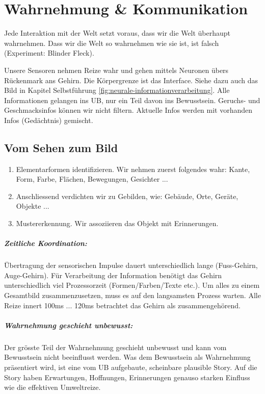 \chapter{Wahrnehmung \& Kommunikation}

Jede Interaktion mit der Welt setzt voraus, dass wir die Welt überhaupt wahrnehmen. Dass wir die Welt so wahrnehmen wie sie ist, ist falsch (Experiment: Blinder Fleck).

Unsere Sensoren nehmen Reize wahr und gehen mittels Neuronen übers Rückenmark ans Gehirn. Die Körpergrenze ist das Interface. Siehe dazu auch das Bild in Kapitel Selbstführung \ref{fig:neurale-informationverarbeitung}. Alle Informationen gelangen ins UB, nur ein Teil davon ins Bewusstsein. Geruchs- und Geschmacksinfos können wir nicht filtern. Aktuelle Infos werden mit vorhanden Infos (Gedächtnis) gemischt.

\section{Vom Sehen zum Bild}
\begin{enumerate}
	\item Elementarformen identifizieren. Wir nehmen zuerst folgendes wahr: Kante, Form, Farbe, Flächen, Bewegungen, Gesichter ...
	\item Anschliessend verdichten wir zu Gebilden, wie: Gebäude, Orte, Geräte, Objekte ...
	\item Mustererkennung. Wir assoziieren das Objekt mit Erinnerungen.
\end{enumerate}

\paragraph{Zeitliche Koordination:}
Übertragung der sensorischen Impulse dauert unterschiedlich lange (Fuss-Gehirn, Auge-Gehirn). Für Verarbeitung der Information benötigt das Gehirn unterschiedlich viel Prozessorzeit (Formen/Farben/Texte etc.). Um alles zu einem Gesamtbild zusammenzusetzen, muss es auf den langsamsten Prozess warten. Alle Reize innert 100ms ... 120ms betrachtet das Gehirn als zusammengehörend. 

\paragraph{Wahrnehmung geschieht unbewusst:}
Der grösste Teil der Wahrnehmung geschieht unbewusst und kann vom Bewusstsein nicht beeinflusst werden. Was dem Bewusstsein als Wahrnehmung präsentiert wird, ist eine vom UB aufgebaute, scheinbare plausible Story. Auf die Story haben Erwartungen, Hoffnungen, Erinnerungen genauso starken Einfluss wie die effektiven Umweltreize.


